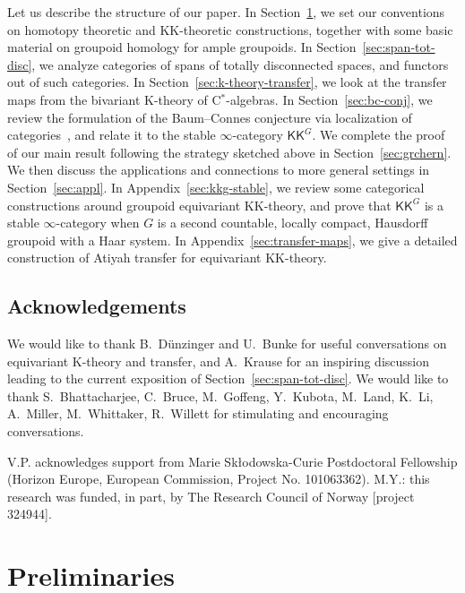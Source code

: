 \documentclass[a4paper,reqno]{amsart}
\theoremstyle{plain}
\theoremstyle{definition}
\theoremstyle{remark}
\numberwithin{equation}{section}
\newcommand{\rK}{\mathrm{K}}
\newcommand{\KK}{\mathrm{KK}}
\newcommand{\icKK}{\mathsf{KK}}
\begin{document}
Let us describe the structure of our paper.
In Section~\ref{sec:prelim}, we set our conventions on homotopy theoretic and $\KK$-theoretic constructions, together with some basic material on groupoid homology for ample groupoids.
In Section~\ref{sec:span-tot-disc}, we analyze categories of spans of totally disconnected spaces, and functors out of such categories.
In Section~\ref{sec:k-theory-transfer}, we look at the transfer maps from the bivariant K-theory of C$^*$-algebras.
In Section~\ref{sec:bc-conj}, we review the formulation of the Baum--Connes conjecture via localization of categories~\cites{nestmeyer:loc,mey:two,val:kthpgrp}, and relate it to the stable $\infty$-category $\icKK^G$.
We complete the proof of our main result following the strategy sketched above in Section~\ref{sec:grchern}.
We then discuss the applications and connections to more general settings in Section~\ref{sec:appl}.
In Appendix~\ref{sec:kkg-stable}, we review some categorical constructions around groupoid equivariant $\KK$-theory, and prove that $\icKK^G$ is a stable $\infty$-category when $G$ is a second countable, locally compact, Hausdorff groupoid with a Haar system.
In Appendix~\ref{sec:transfer-maps}, we give a detailed construction of Atiyah transfer for equivariant $\KK$-theory.

\subsection*{Acknowledgements}
We would like to thank B.~Dünzinger and U.~Bunke for useful conversations on equivariant $\rK$-theory and transfer, and A.~Krause for an inspiring discussion leading to the current exposition of Section~\ref{sec:span-tot-disc}.
We would like to thank S.~Bhattacharjee, C.~Bruce, M.~Goffeng, Y.~Kubota, M.~Land, K.~Li, A.~Miller, M.~Whittaker, R.~Willett for stimulating and encouraging conversations.

V.P. acknowledges support from Marie Skłodowska-Curie Postdoctoral Fellowship (Horizon Europe, European Commission, Project No. 101063362).
M.Y.: this research was funded, in part, by The Research Council of Norway [project 324944].

\section{Preliminaries}\label{sec:prelim}
\end{document}
